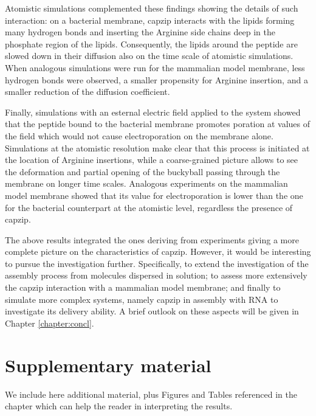 Atomistic simulations complemented these findings showing the details of such interaction: on a bacterial membrane, capzip interacts with the lipids forming many hydrogen bonds and inserting the Arginine side chains deep in the phosphate region of the lipids. Consequently, the lipids around the peptide are slowed down in their diffusion also on the time scale of atomistic simulations. When analogous simulations were run for the mammalian model membrane, less hydrogen bonds were observed, a smaller propensity for Arginine insertion, and a smaller reduction of the diffusion coefficient.

Finally, simulations with an esternal electric field applied to the system showed that the peptide bound to the bacterial membrane promotes poration at values of the field which would not cause electroporation on the membrane alone. Simulations at the atomistic resolution make clear that this process is initiated at the location of Arginine insertions, while a coarse-grained picture allows to see the deformation and partial opening of the buckyball passing through the membrane on longer time scales.
%
Analogous experiments on the mammalian model membrane showed that its value for electroporation is lower than the one for the bacterial counterpart at the atomistic level, regardless the presence of capzip.

The above results integrated the ones deriving from experiments giving a more complete picture on the characteristics of capzip. However, it would be interesting to pursue the investigation further. Specifically, to extend the investigation of the assembly process from molecules dispersed in solution; to assess more extensively the capzip interaction with a mammalian model membrane;
and finally to simulate more complex systems, namely capzip in assembly with RNA to investigate its delivery ability.
%
A brief outlook on these aspects will be given in Chapter \ref{chapter:concl}.




\section{Supplementary material} \label{sec:ch3_SI}

We include here additional material, plus Figures and Tables referenced in the chapter which can help the reader in interpreting the results.

